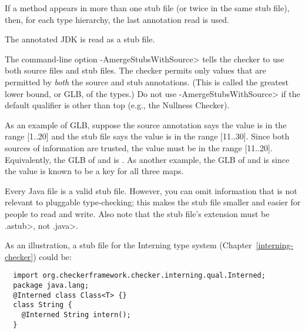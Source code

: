If a method appears in more than one stub file (or twice in the same
stub file), then, for each type hierarchy, the last annotation read is used.

The annotated JDK is read as a stub file.

The command-line option \<-AmergeStubsWithSource> tells the checker to use
both source files and stub files.  The checker permits only values that are
permitted by \emph{both} the source and stub annotations.  (This is called
the greatest lower bound, or GLB, of the types.)
Do not use \<-AmergeStubsWithSource> if the default qualifier
is other than top (e.g., the Nullness Checker).

As an example of GLB, suppose the source annotation says the value is in
the range [1..20] and the stub file says the value is in the range
[11..30].  Since both sources of information are trusted, the value must be
in the range [11..20].  Equivalently, the GLB of
 and
 is
.
As another example, the GLB of
 and
 is
since the value is known to be a key for all three maps.



Every Java file is a valid stub file.  However, you can omit information
that is not relevant to pluggable type-checking; this makes the stub file
smaller and easier for people to read and write.
Also note that the stub file's extension must be \<.astub>, not \<.java>.

As an illustration, a stub file for the Interning type system
(Chapter~\ref{interning-checker}) could be:

\begin{Verbatim}
  import org.checkerframework.checker.interning.qual.Interned;
  package java.lang;
  @Interned class Class<T> {}
  class String {
    @Interned String intern();
  }
\end{Verbatim}

